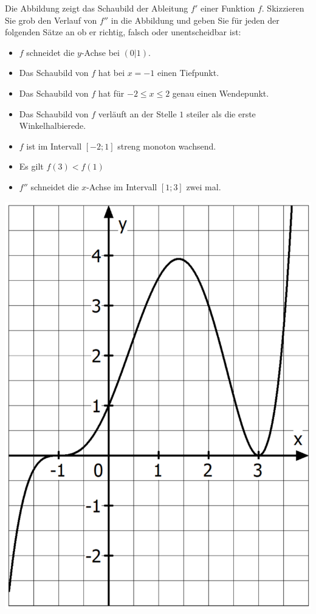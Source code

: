 \aufgabe{}
\begin{multicols}{2}
	Die Abbildung zeigt das Schaubild der Ableitung $f'$ einer Funktion $f$. Skizzieren Sie grob den Verlauf von $f''$ in die Abbildung und geben Sie für jeden der folgenden Sätze an ob er richtig, falsch oder unentscheidbar ist:
	\begin{itemize}
		\item $f$ schneidet die $y$-Achse bei $(0|1)$.
		\item Das Schaubild von $f$ hat bei $x=-1$ einen Tiefpunkt.
		\item Das Schaubild von $f$ hat für $-2\leq x \leq 2$ genau einen Wendepunkt.
		\item Das Schaubild von $f$ verläuft an der Stelle $1$ steiler als die erste Winkelhalbierede.
		\item $f$ ist im Intervall $[-2;1]$ streng monoton wachsend.
		\item Es gilt $f(3)<f(1)$
		\item $f''$ schneidet die $x$-Achse im Intervall $[1;3]$ zwei mal.
	\end{itemize}
	\columnbreak
	\centering
	\includegraphics[width=0.7\linewidth]{Monotonieanalyse.png}

\end{multicols}
\begin{lsg}{}

\end{lsg}

